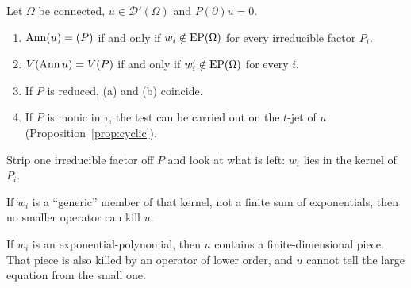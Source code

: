 \begin{theorem}\label{f:thm:ident}
Let $\Omega$ be connected, $u\in\mathcal D'(\Omega)$ and $P(\partial)u=0$.
\begin{enumerate}[label=(\alph*)]
\item $\operatorname{Ann}(u)=(P)$ if and only if $w_i\notin\mathrm{EP}(\Omega)$ for every irreducible factor $P_i$.
\item $V(\operatorname{Ann} u)=V(P)$ if and only if $w_i'\notin\mathrm{EP}(\Omega)$ for every $i$.
\item If $P$ is reduced, (a) and (b) coincide.
\item If $P$ is monic in $\tau$, the test can be carried out on the $t$-jet of $u$ (Proposition~\ref{prop:cyclic}).
\end{enumerate}
\end{theorem}

\begin{intuition}
Strip one irreducible factor off $P$ and look at what is left: $w_i$ lies in the kernel of $P_i$.

If $w_i$ is a ``generic'' member of that kernel, not a finite sum of exponentials, then no smaller operator can kill $u$.

If $w_i$ is an exponential-polynomial, then $u$ contains a finite-dimensional piece. That piece is also killed by an operator of lower order, and $u$ cannot tell the large equation from the small one.
\end{intuition}

